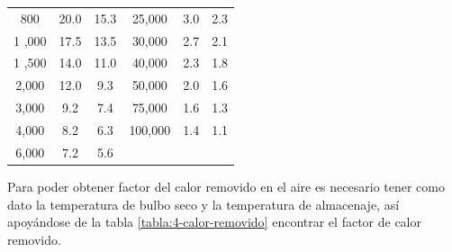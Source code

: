 \begin{table}[H]
\begin{tabular}{cccccc}
 		800                                                                      & 20.0                                 & 15.3                                 & 25,000                                & 3.0                                 & 2.3                                 \\
 		1 ,000                                                                   & 17.5                                 & 13.5                                 & 30,000                                & 2.7                                 & 2.1                                 \\
 		1 ,500                                                                   & 14.0                                 & 11.0                                 & 40,000                                & 2.3                                 & 1.8                                 \\
 		2,000                                                                    & 12.0                                 & 9.3                                  & 50,000                                & 2.0                                 & 1.6                                 \\
 		3,000                                                                    & 9.2                                  & 7.4                                  & 75,000                                & 1.6                                 & 1.3                                 \\
 		4,000                                                                    & 8.2                                  & 6.3                                  & 100,000                               & 1.4                                 & 1.1                                 \\
 		6,000                                                                    & 7.2                                  & 5.6                                  &                                       &                                     &                                     \\ \hline
 	\end{tabular}
 	\end{table}
 	
 	
 	Para poder obtener factor del calor removido en el aire es necesario tener como dato la
 	temperatura de bulbo seco y la temperatura de almacenaje, así apoyándose de la tabla \ref{tabla:4-calor-removido} encontrar el factor de calor removido.
 
